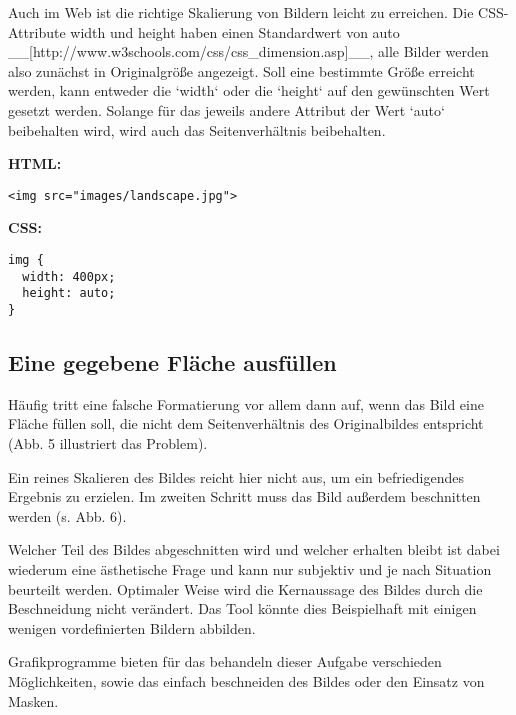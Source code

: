 Auch im Web ist die richtige Skalierung von Bildern leicht zu erreichen. Die CSS-Attribute width und height haben einen Standardwert von auto __[http://www.w3schools.com/css/css_dimension.asp]__, alle Bilder werden also zunächst in Originalgröße angezeigt. Soll eine bestimmte Größe erreicht werden, kann entweder die `width` oder die `height` auf den gewünschten Wert gesetzt werden. Solange für das jeweils andere Attribut der Wert `auto` beibehalten wird, wird auch das Seitenverhältnis beibehalten.

\textbf{HTML:}
\begin{lstlisting}
<img src="images/landscape.jpg">
\end{lstlisting}

\textbf{CSS:}
\begin{lstlisting}
img {
  width: 400px;
  height: auto;
}
\end{lstlisting}

\subsection{Eine gegebene Fläche ausfüllen}
Häufig tritt eine falsche Formatierung vor allem dann auf, wenn das Bild eine Fläche füllen soll, die nicht dem Seitenverhältnis des Originalbildes entspricht (Abb. 5 illustriert das Problem).


Ein reines Skalieren des Bildes reicht hier nicht aus, um ein befriedigendes Ergebnis zu erzielen. Im zweiten Schritt muss das Bild außerdem beschnitten werden (s. Abb. 6).


Welcher Teil des Bildes abgeschnitten wird und welcher erhalten bleibt ist dabei wiederum eine ästhetische Frage und kann nur subjektiv und je nach Situation beurteilt werden. Optimaler Weise wird die Kernaussage des Bildes durch die Beschneidung nicht verändert. Das Tool könnte dies Beispielhaft mit einigen wenigen vordefinierten Bildern abbilden.


Grafikprogramme bieten für das behandeln dieser Aufgabe verschieden Möglichkeiten, sowie das einfach beschneiden des Bildes oder den Einsatz von Masken.


